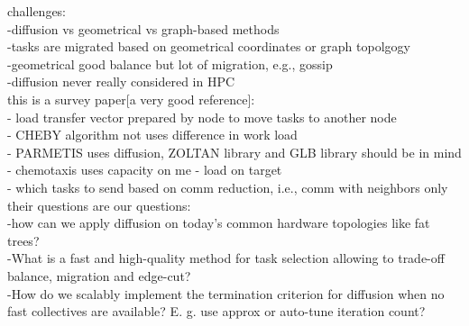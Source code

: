 challenges:\\
-diffusion vs geometrical vs graph-based methods\\
-tasks are migrated based on geometrical coordinates or graph topolgogy\\
-geometrical good balance but lot of migration, e.g., gossip\\
-diffusion never really considered in HPC\\
this is a survey paper[a very good reference]:\\
- load transfer vector prepared by node to move tasks to another node\\
- CHEBY algorithm not uses difference in work load\\
- PARMETIS uses diffusion, ZOLTAN library and GLB library should be in mind\\
- chemotaxis uses capacity on me - load on target\\
- which tasks to send based on comm reduction, i.e., comm with neighbors only\\
their questions are our questions:\\
-how can we apply diffusion on today’s common hardware topologies like fat trees?\\
-What is a fast and high-quality method for task selection allowing to trade-off balance, migration and edge-cut? \\
-How do we scalably implement the termination criterion for diffusion when no fast collectives are available? E. g. use approx or auto-tune iteration count?\\ 
